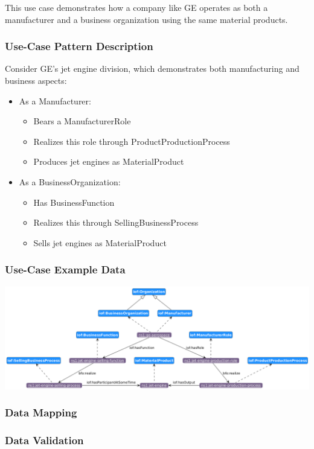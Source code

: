 This use case demonstrates how a company like GE operates as both a manufacturer and a business organization using the same material products.

\subsubsection*{Use-Case Pattern Description}

Consider GE's jet engine division, which demonstrates both manufacturing and business aspects:

\begin{itemize}
    \item As a Manufacturer: 
    \begin{itemize}
        \item Bears a ManufacturerRole
        \item Realizes this role through ProductProductionProcess
        \item Produces jet engines as MaterialProduct
    \end{itemize}
    \item As a BusinessOrganization: 
    \begin{itemize}
        \item Has BusinessFunction
        \item Realizes this through SellingBusinessProcess
        \item Sells jet engines as MaterialProduct
    \end{itemize}
\end{itemize}

\subsubsection*{Use-Case Example Data}
\includegraphics[scale=0.4]{scenarios/different-type-organizations/image/different-type-organizations}

\begin{table}[h]
\label{tab:organization-structure}
\end{table}


\subsubsection*{Data Mapping}


\subsubsection*{Data Validation}
